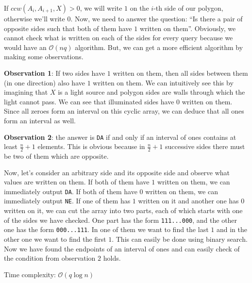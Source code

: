 \documentclass[a4paper]{article}
\begin{document}
If $ccw(A_{i}, A_{i+1}, X) > 0$, we will write $1$ on the $i$-th side of
our polygon, otherwise we'll write $0$. Now, we need to answer the question:
``Is there a pair of opposite sides such that both of them have $1$ written
on them''. Obviously, we cannot check what is written on each of the sides for
every query because we would have an $\mathcal{O}(nq)$ algorithm. But, we can
get a more efficient algorithm by making some observations.

\textbf{Observation 1}: If two sides have $1$ written on them, then all sides
between them (in one direction) also have $1$ written on them. We can
intuitively see this by imagining that $X$ is a light source and polygon sides
are walls through which the light cannot pass. We can see that illuminated
sides have $0$ written on them. Since all zeroes form an interval on this cyclic
array, we can deduce that all ones form an interval as well.

\textbf{Observation 2}: the answer is \texttt{DA} if and only if an interval
of ones contains at least $\frac{n}{2}+1$ elements. This is obvious because in
$\frac{n}{2}+1$ successive sides there must be two of them which are opposite.

Now, let's consider an arbitrary side and its opposite side and observe what
values are written on them. If both of them have $1$ written on them, we can
immediately output \texttt{DA}. If both of them have $0$ written on them, we
can immediately output \texttt{NE}. If one of them has $1$ written on it and
another one has $0$ written on it, we can cut the array into two parts, each
of which starts with one of the sides we have checked. One part has the form
\texttt{111...000}, and the other one has the form \texttt{000...111}. In one
of them we want to find the last $1$ and in the other one we want to find the
first $1$. This can easily be done using binary search. Now we have found the
endpoints of an interval of ones and can easily check of the condition from
observation $2$ holds.

Time complexity: $\mathcal{O}(q \log n)$
\end{document}

